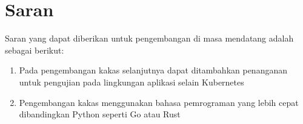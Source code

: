\section{Saran}
Saran yang dapat diberikan untuk pengembangan di masa mendatang adalah sebagai berikut:
\begin{enumerate}
	\item Pada pengembangan kakas selanjutnya dapat ditambahkan penanganan untuk pengujian pada lingkungan aplikasi selain Kubernetes
	\item Pengembangan kakas menggunakan bahasa pemrograman yang lebih cepat dibandingkan Python seperti Go atau Rust
\end{enumerate}